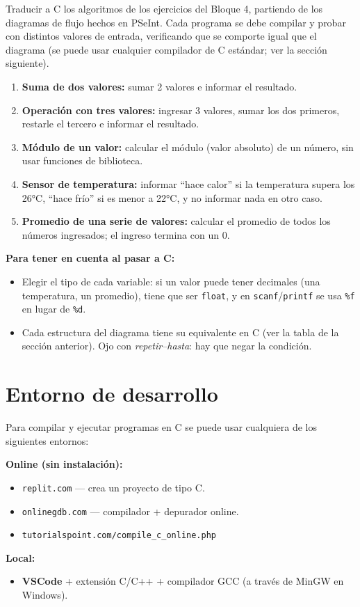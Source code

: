 Traducir a C los algoritmos de los ejercicios del Bloque 4, partiendo de los diagramas de flujo hechos en PSeInt. Cada programa se debe compilar y probar con distintos valores de entrada, verificando que se comporte igual que el diagrama (se puede usar cualquier compilador de C estándar; ver la sección siguiente).

\begin{enumerate}
  \item \textbf{Suma de dos valores:} sumar 2 valores e informar el resultado.
  \item \textbf{Operación con tres valores:} ingresar 3 valores, sumar los dos primeros, restarle el tercero e informar el resultado.
  \item \textbf{Módulo de un valor:} calcular el módulo (valor absoluto) de un número, sin usar funciones de biblioteca.
  \item \textbf{Sensor de temperatura:} informar ``hace calor'' si la temperatura supera los 26°C, ``hace frío'' si es menor a 22°C, y no informar nada en otro caso.
  \item \textbf{Promedio de una serie de valores:} calcular el promedio de todos los números ingresados; el ingreso termina con un 0.
\end{enumerate}

\begin{notabox}
\textbf{Para tener en cuenta al pasar a C:}
\begin{itemize}
  \item Elegir el tipo de cada variable: si un valor puede tener decimales (una temperatura, un promedio), tiene que ser \texttt{float}, y en \texttt{scanf}/\texttt{printf} se usa \texttt{\%f} en lugar de \texttt{\%d}.
  \item Cada estructura del diagrama tiene su equivalente en C (ver la tabla de la sección anterior). Ojo con \emph{repetir--hasta}: hay que negar la condición.
\end{itemize}
\end{notabox}

\section{Entorno de desarrollo}

Para compilar y ejecutar programas en C se puede usar cualquiera de los siguientes entornos:

\textbf{Online (sin instalación):}
\begin{itemize}
    \item \texttt{replit.com} --- crea un proyecto de tipo C.
    \item \texttt{onlinegdb.com} --- compilador + depurador online.
    \item \texttt{tutorialspoint.com/compile\_c\_online.php}
\end{itemize}

\textbf{Local:}
\begin{itemize}
    \item \textbf{VSCode} + extensión C/C++ + compilador GCC (a través de MinGW en Windows).
\end{itemize}
